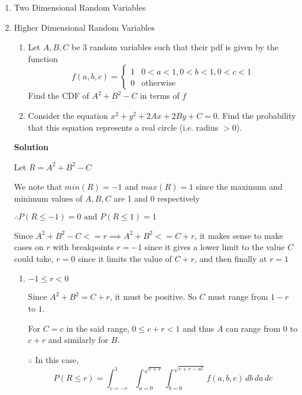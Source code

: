 \documentclass[12pt, oneside]{article}
\begin{document}
\begin{enumerate}
\item Two Dimensional Random Variables

\item {
    Higher Dimensional Random Variables

    \begin{enumerate}
        \item Let \(A, B, C\) be 3 random variables such that their pdf is given by the function
        \[
            f(a, b, c) = \begin{cases}
                            1 & 0 < a < 1, 0 < b < 1, 0 < c < 1 \\
                            0 & \text{otherwise}
                         \end{cases}
        \]
        Find the CDF of \(A^2 + B^2 - C\) in terms of \(f\)
        \item Consider the equation \(x^2 + y^2 + 2Ax + 2By + C = 0\). Find the probability
        that this equation represents a real circle (i.e. radius \(> 0\)).
    \end{enumerate}

    \textbf{Solution}

    Let \(R = A^2 + B^2 - C\)

    We note that \(min(R) = -1\) and \(max(R) = 1\) since the maximum and minimum values
    of \(A, B, C\) are 1 and 0 respectively

    \(\therefore P(R \leq -1) = 0 \text{ and } P(R \leq 1) = 1\)

    Since \(A^2 + B^2 - C <= r \implies A^2 + B^2 <= C + r\), it makes sense to make
    cases on \(r\) with breakpoints \(r = -1\) since it gives a lower limit to the value
    \(C\) could take, \(r = 0\) since it limits the value of \(C + r\), and then finally
    at \(r = 1\)

    \begin{enumerate}
        \item {
            \(-1 \leq r < 0\)

            Since \(A^2 + B^2 = C + r\), it must be positive. So \(C\) must range from
            \(1 - r\) to \(1\). 

            For \(C = c\) in the said range, \(0 \leq c + r < 1\) and thus \(A\) can
            range from 0 to \(c + r\) and similarly for \(B\).

            \(\therefore\) In this case,
            \[
                P(R \leq r) = \int_{c = -r}^{1} \int_{a=0}^{\sqrt{c + r}} 
                              \int_{b = 0}^{\sqrt{c + r - a^2}} f(a, b, c)\, db\, da\, dc
            \]
        }


\end{enumerate}}
\end{enumerate}
\end{document}

